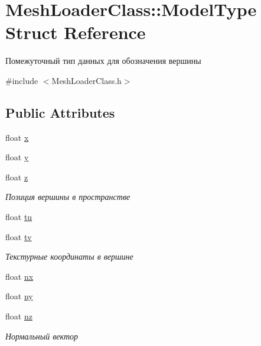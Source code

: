 \hypertarget{struct_mesh_loader_class_1_1_model_type}{}\section{Mesh\+Loader\+Class\+:\+:Model\+Type Struct Reference}
\label{struct_mesh_loader_class_1_1_model_type}


Помежуточный тип данных для обозначения вершины  




{\ttfamily \#include $<$Mesh\+Loader\+Class.\+h$>$}

\subsection*{Public Attributes}
\begin{DoxyCompactItemize}
\item 
float \hyperlink{struct_mesh_loader_class_1_1_model_type_a7e522a6a8e6583d47052510258927020}{x}
\item 
float \hyperlink{struct_mesh_loader_class_1_1_model_type_a20a1cd78a6cd4da2be41cafdef6374ba}{y}
\item 
float \hyperlink{struct_mesh_loader_class_1_1_model_type_ad09ef47c7dd94e90c7d74c7a0fed4c74}{z}
\begin{DoxyCompactList}\small\item\em Позиция вершины в пространстве \end{DoxyCompactList}\item 
float \hyperlink{struct_mesh_loader_class_1_1_model_type_a11adb85b8aed91a5a20a82e05517b068}{tu}
\item 
float \hyperlink{struct_mesh_loader_class_1_1_model_type_a12f030167c3e887d1895f650196336c8}{tv}
\begin{DoxyCompactList}\small\item\em Текстурные координаты в вершине \end{DoxyCompactList}\item 
float \hyperlink{struct_mesh_loader_class_1_1_model_type_a818fc5177221d3535c0b6e43fadcea1d}{nx}
\item 
float \hyperlink{struct_mesh_loader_class_1_1_model_type_a0438a48bc77f3288416c6c11f2e477fd}{ny}
\item 
float \hyperlink{struct_mesh_loader_class_1_1_model_type_a220488dbc6c275675d1574be2b719aea}{nz}
\begin{DoxyCompactList}\small\item\em Нормальный вектор \end{DoxyCompactList}\end{DoxyCompactItemize}


